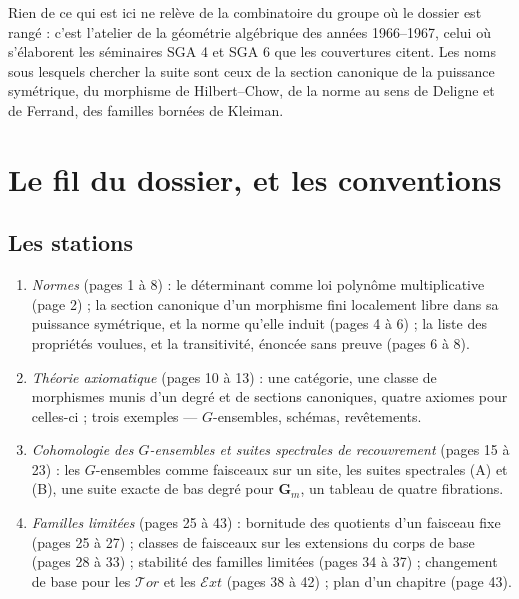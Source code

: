 \documentclass[11pt,a4paper]{article}
\begin{document}
\begin{resume}
Rien de ce qui est ici ne relève de la combinatoire du groupe où le dossier
est rangé : c'est l'atelier de la géométrie algébrique des années 1966--1967,
celui où s'élaborent les séminaires SGA 4 et SGA 6 que les couvertures
citent. Les noms sous lesquels chercher la suite sont ceux de la
section canonique de la puissance symétrique, du morphisme de Hilbert--Chow,
de la norme au sens de Deligne et de Ferrand, des familles bornées de Kleiman.

\end{resume}

\section*{Le fil du dossier, et les conventions}

\subsection*{Les stations}

\begin{enumerate}
\item[I.] \emph{Normes} (pages 1 à 8) : le déterminant comme loi
polynôme multiplicative (page 2) ; la section canonique d'un morphisme
fini localement libre dans sa puissance symétrique, et la norme qu'elle
induit (pages 4 à 6) ; la liste des propriétés voulues, et la
transitivité, énoncée sans preuve (pages 6 à 8).
\item[II.] \emph{Théorie axiomatique} (pages 10 à 13) : une catégorie, une
classe de morphismes munis d'un degré et de sections canoniques, quatre
axiomes pour celles-ci ; trois exemples --- $G$-ensembles, schémas,
revêtements.
\item[III.] \emph{Cohomologie des $G$-ensembles et suites spectrales de
recouvrement} (pages 15 à 23) : les $G$-ensembles comme faisceaux sur un
site, les suites spectrales (A) et (B), une suite exacte de bas degré pour
$\mathbf{G}_m$, un tableau de quatre fibrations.
\item[IV.] \emph{Familles limitées} (pages 25 à 43) : bornitude des
quotients d'un faisceau fixe (pages 25 à 27) ; classes de faisceaux sur les
extensions du corps de base (pages 28 à 33) ; stabilité des familles
limitées (pages 34 à 37) ; changement de base pour les $\mathcal{T}or$ et les
$\mathcal{E}xt$ (pages 38 à 42) ; plan d'un chapitre (page 43).
\end{enumerate}
\end{document}
